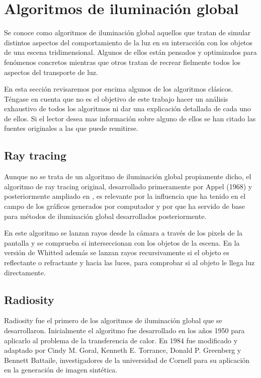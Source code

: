 \clearpage

\section{Algoritmos de iluminación global}

Se conoce como algoritmos de iluminación global aquellos que tratan de simular distintos aspectos del comportamiento de la luz en su interacción con los objetos de una escena tridimensional. Algunos de ellos están pensados y optimizados para fenómenos concretos mientras que otros tratan de recrear fielmente todos los aspectos del transporte de luz.

\medskip
En esta sección revisaremos por encima algunos de los algoritmos clásicos. Téngase en cuenta que no es el objetivo de este trabajo hacer un análisis exhaustivo de todos los algoritmos ni dar una explicación detallada de cada uno de ellos. Si el lector desea mas información sobre alguno de ellos se han citado las fuentes originales a las que puede remitirse.

\subsection{Ray tracing}

Aunque no se trata de un algoritmo de iluminación global propiamente dicho, el algoritmo de ray tracing original, desarrollado primeramente por Appel (1968)\nocite{Appel1968} y posteriormente ampliado en \cite{Whitted1979}, es relevante por la influencia que ha tenido en el campo de los gráficos generados por computador y por que ha servido de base para métodos de iluminación global desarrollados posteriormente. 

\medskip

En este algoritmo se lanzan rayos desde la cámara a través de los pixels de la pantalla y se comprueba si interseccionan con los objetos de la escena. En la versión de Whitted además se lanzan rayos recursivamente si el objeto es reflectante o refractante y hacia las luces, para comprobar si al objeto le llega luz directamente.

 
\subsection{Radiosity}

Radiosity fue el primero de los algoritmos de iluminación global que se desarrollaron. Inicialmente el algoritmo fue desarrollado en los años 1950 para aplicarlo al problema de la transferencia de calor. En 1984 fue modificado y adaptado por \nocite{Goral1984} Cindy M. Goral, Kenneth E. Torrance, Donald P. Greenberg y Bennett Battaile, investigadores de la universidad de Cornell para su aplicación en la generación de imagen sintética.

